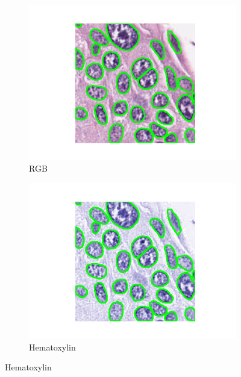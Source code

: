 \documentclass[target=bach,aauheader=,style=]{thud}
\begin{document}
\begin{figure}[!htbp]
\begin{subfigure}{0.48\textwidth}
  \centering
  \includegraphics[width=\linewidth]{imgs/qualitative/best/RGB/contour_img.png}
  \caption{RGB}
\end{subfigure}\hfill
\begin{subfigure}{0.48\textwidth}
  \centering
  \includegraphics[width=\linewidth]{imgs/qualitative/best/HE/contour_img.png}
  \caption{Hematoxylin}
\end{subfigure}


\end{figure}
\end{document}
